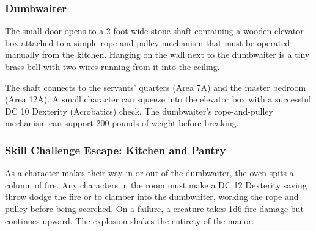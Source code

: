 \subsubsection*{Dumbwaiter}
\begin{readout}
  The small door opens to a 2-foot-wide stone shaft containing a wooden elevator box attached to a simple
  rope-and-pulley mechanism that must be operated manually from the kitchen. Hanging on the wall next to the
  dumbwaiter is a tiny brass bell with two wires running from it into the ceiling.
\end{readout}
The shaft connects to the servants' quarters (Area 7A) and the master bedroom (Area 12A). A small character can
squeeze into the elevator box with a successful DC 10 Dexterity (Acrobatics) check. The dumbwaiter's
rope-and-pulley mechanism can support 200 pounds of weight before breaking.

\begin{arealinks}
\end{arealinks}

\subsubsection*{Skill Challenge Escape: Kitchen and Pantry}
\label{sec:SC_KitchenAndPantry}
As a character makes their way in or out of the dumbwaiter, the oven spits a column of fire. Any characters in
the room must make a DC 12 Dexterity saving throw dodge the fire or to clamber into the dumbwaiter, working the 
rope and pulley before being scorched. On a failure, a creature takes 1d6 fire damage but continues upward. The
explosion shakes the entirety of the manor.


\pagebreak
